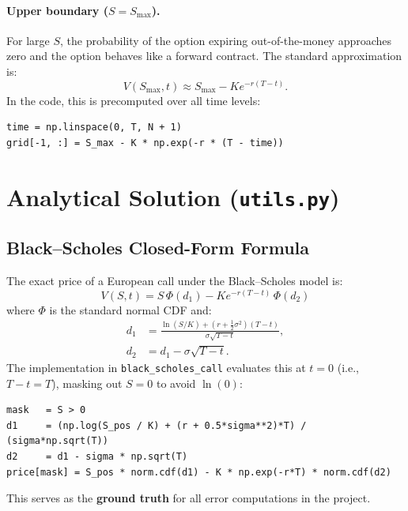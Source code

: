 \documentclass[12pt, a4paper]{article}
\begin{document}
\paragraph{Upper boundary ($S = S_{\max}$).}
For large $S$, the probability of the option expiring out-of-the-money
approaches zero and the option behaves like a forward contract. The standard
approximation is:
\begin{equation}
    V(S_{\max}, t) \approx S_{\max} - K e^{-r(T - t)}.
    \label{eq:bc_upper}
\end{equation}
In the code, this is precomputed over all time levels:
\begin{lstlisting}
time = np.linspace(0, T, N + 1)
grid[-1, :] = S_max - K * np.exp(-r * (T - time))
\end{lstlisting}

\section{Analytical Solution (\texttt{utils.py})}

\subsection{Black--Scholes Closed-Form Formula}

The exact price of a European call under the Black--Scholes model is:
\begin{equation}
    \boxed{V(S, t) = S\,\Phi(d_1) - K e^{-r(T-t)}\,\Phi(d_2)}
    \label{eq:bs_formula}
\end{equation}
where $\Phi$ is the standard normal CDF and:
\begin{align}
    d_1 &= \frac{\ln(S/K) + (r + \tfrac{1}{2}\sigma^2)(T-t)}{\sigma\sqrt{T-t}},
    \label{eq:d1} \\
    d_2 &= d_1 - \sigma\sqrt{T-t}.
    \label{eq:d2}
\end{align}
The implementation in \texttt{black\_scholes\_call} evaluates this at $t = 0$
(i.e., $T - t = T$), masking out $S = 0$ to avoid $\ln(0)$:
\begin{lstlisting}
mask   = S > 0
d1     = (np.log(S_pos / K) + (r + 0.5*sigma**2)*T) / (sigma*np.sqrt(T))
d2     = d1 - sigma * np.sqrt(T)
price[mask] = S_pos * norm.cdf(d1) - K * np.exp(-r*T) * norm.cdf(d2)
\end{lstlisting}
This serves as the \textbf{ground truth} for all error computations in the
project.
\end{document}
